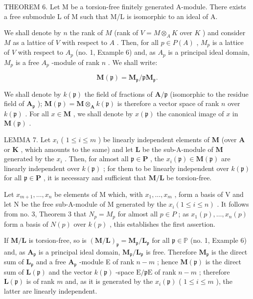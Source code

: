 THEOREM 6. Let M be a torsion-free finitely generated A-module. There exists a free submodule L of M such that M/L is isomorphic to an ideal of A.

We shall denote by \(n\) the rank of \(M\) (rank of \(V = M \otimes_{A} K\) over \(K\) ) and consider \(M\) as a lattice of \(V\) with respect to \(A\) . Then, for all \(p \in P(A)\) , \(M_p\) is a lattice of \(V\) with respect to \(A_p\) (no. 1, Example 6) and, as \(A_p\) is a principal ideal domain, \(M_p\) is a free \(A_p\) -module of rank \(n\) . We shall write:

\[
\mathbf {M} (\mathfrak {p}) = \mathbf {M} _ {\mathfrak {p}} / \mathfrak {p} \mathbf {M} _ {\mathfrak {p}}.
\]

We shall denote by \(k(\mathfrak{p})\) the field of fractions of \(\mathbf{A} / \mathfrak{p}\) (isomorphic to the residue field of \(\mathbf{A}_{\mathfrak{p}}\) ); \(\mathbf{M}(\mathfrak{p}) = \mathbf{M} \otimes_{\mathbf{A}} k(\mathfrak{p})\) is therefore a vector space of rank \(n\) over \(k(\mathfrak{p})\) . For all \(x \in \mathbf{M}\) , we shall denote by \(x(\mathfrak{p})\) the canonical image of \(x\) in \(\mathbf{M}(\mathfrak{p})\) .

LEMMA 7. Let \(x_{i}\) ( \(1 \leqslant i \leqslant m\) ) be linearly independent elements of \(\mathbf{M}\) (over \(\mathbf{A}\) or \(\mathbf{K}\) , which amounts to the same) and let \(\mathbf{L}\) be the sub-A-module of \(\mathbf{M}\) generated by the \(x_{i}\) . Then, for almost all \(\mathfrak{p} \in \mathbf{P}\) , the \(x_{i}(\mathfrak{p}) \in \mathbf{M}(\mathfrak{p})\) are linearly independent over \(k(\mathfrak{p})\) ; for them to be linearly independent over \(k(\mathfrak{p})\) for all \(\mathfrak{p} \in \mathbf{P}\) , it is necessary and sufficient that \(\mathbf{M}/\mathbf{L}\) be torsion-free.

Let \(x_{m+1}, \ldots, x_n\) be elements of M which, with \(x_1, \ldots, x_m\) , form a basis of V and let N be the free sub-A-module of M generated by the \(x_i (1 \leqslant i \leqslant n)\) . It follows from no. 3, Theorem 3 that \(N_p = M_p\) for almost all \(p \in P\) ; as \(x_1(p), \ldots, x_n(p)\) form a basis of \(N(p)\) over \(k(p)\) , this establishes the first assertion.

If \(\mathbf{M} / \mathbf{L}\) is torsion-free, so is \((\mathbf{M} / \mathbf{L})_{\mathfrak{p}} = \mathbf{M}_{\mathfrak{p}} / \mathbf{L}_{\mathfrak{p}}\) for all \(\mathfrak{p} \in \mathbb{P}\) (no. 1, Example 6) and, as \(\mathbf{A}_{\mathfrak{p}}\) is a principal ideal domain, \(\mathbf{M}_{\mathfrak{p}} / \mathbf{L}_{\mathfrak{p}}\) is free. Therefore \(\mathbf{M}_{\mathfrak{p}}\) is the direct sum of \(\mathbf{L}_{\mathfrak{p}}\) and a free \(\mathbf{A}_{\mathfrak{p}}\) -module E of rank \(n - m\) ; hence \(\mathbf{M}(\mathfrak{p})\) is the direct sum of \(\mathbf{L}(\mathfrak{p})\) and the vector \(k(\mathfrak{p})\) -space \(\mathrm{E} / \mathfrak{p}\mathrm{E}\) of rank \(n - m\) ; therefore \(\mathbf{L}(\mathfrak{p})\) is of rank \(m\) and, as it is generated by the \(x_{i}(\mathfrak{p})\) ( \(1 \leqslant i \leqslant m\) ), the latter are linearly independent.

